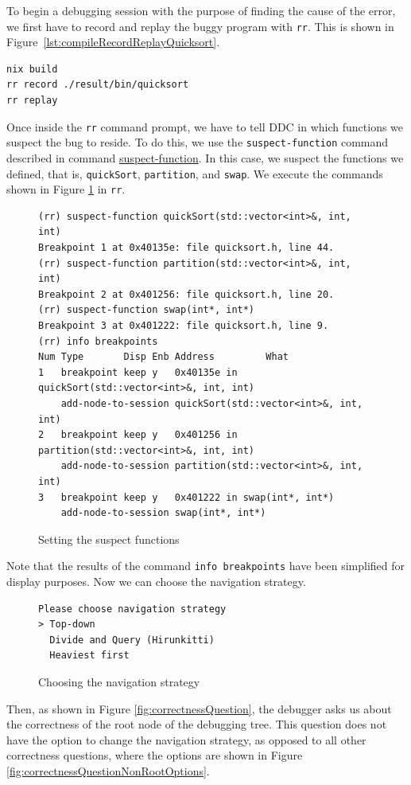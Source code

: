 To begin a debugging session with the purpose of finding the cause of the error, we first have to record and replay the buggy program with \verb|rr|. This is shown in
Figure~\ref{lst:compileRecordReplayQuicksort}.
\begin{lstlisting}[language=bash, caption={Compiling, recording and replaying quickSort}, frame=tb, label={lst:compileRecordReplayQuicksort}]
nix build
rr record ./result/bin/quicksort
rr replay
\end{lstlisting}
Once inside the \verb|rr| command prompt, we have to tell DDC in which functions we suspect the bug to reside.
To do this, we use the \verb|suspect-function| command described in command \hyperref[command:suspect-function]{suspect-function}. In this case, we suspect the functions we defined, that is, \verb|quickSort|, \verb|partition|, and \verb|swap|. We execute the commands shown in Figure \ref{fig:suspecting-functions} in \verb|rr|.
\begin{figure}
    \centering
    \caption{Setting the suspect functions}
    \label{fig:suspecting-functions}
    \begin{verbatim}
(rr) suspect-function quickSort(std::vector<int>&, int, int)
Breakpoint 1 at 0x40135e: file quicksort.h, line 44.
(rr) suspect-function partition(std::vector<int>&, int, int)
Breakpoint 2 at 0x401256: file quicksort.h, line 20.
(rr) suspect-function swap(int*, int*)
Breakpoint 3 at 0x401222: file quicksort.h, line 9.
(rr) info breakpoints
Num Type       Disp Enb Address         What
1   breakpoint keep y   0x40135e in quickSort(std::vector<int>&, int, int)
    add-node-to-session quickSort(std::vector<int>&, int, int)
2   breakpoint keep y   0x401256 in partition(std::vector<int>&, int, int)
    add-node-to-session partition(std::vector<int>&, int, int)
3   breakpoint keep y   0x401222 in swap(int*, int*)
    add-node-to-session swap(int*, int*)
    \end{verbatim}
\end{figure}
Note that the results of the command \verb|info breakpoints| have been simplified for display purposes.
Now we can choose the navigation strategy.
\begin{figure}
    \centering
    \caption{Choosing the navigation strategy}
    \label{fig:navigationsStrategyPrompt}
    \begin{verbatim}
Please choose navigation strategy
> Top-down
  Divide and Query (Hirunkitti)
  Heaviest first
    \end{verbatim}
\end{figure}
Then, as shown in Figure \ref{fig:correctnessQuestion}, the debugger asks us about the correctness of the root node of the debugging tree. This question does not have the option to change the navigation strategy, as opposed to all other correctness questions, where the options are shown in Figure \ref{fig:correctnessQuestionNonRootOptions}.

